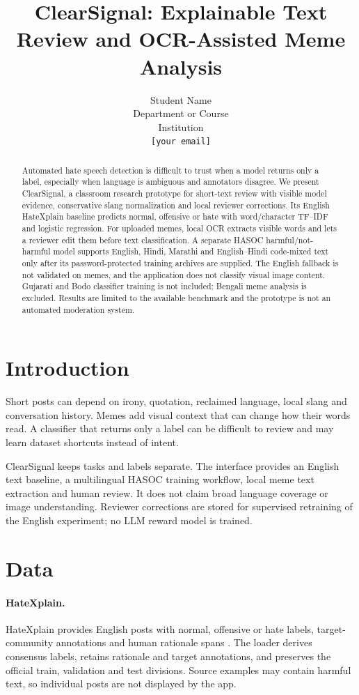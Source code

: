 \documentclass[11pt]{article}
\title{ClearSignal: Explainable Text Review and OCR-Assisted Meme Analysis}
\author{Student Name \\
  Department or Course \\
  Institution \\
  \texttt{[your email]}}
\begin{document}
\maketitle

\begin{abstract}
Automated hate speech detection is difficult to trust when a model returns only a label, especially when language is ambiguous and annotators disagree. We present ClearSignal, a classroom research prototype for short-text review with visible model evidence, conservative slang normalization and local reviewer corrections. Its English HateXplain baseline predicts normal, offensive or hate with word/character TF--IDF and logistic regression. For uploaded memes, local OCR extracts visible words and lets a reviewer edit them before text classification. A separate HASOC harmful/not-harmful model supports English, Hindi, Marathi and English--Hindi code-mixed text only after its password-protected training archives are supplied. The English fallback is not validated on memes, and the application does not classify visual image content. Gujarati and Bodo classifier training is not included; Bengali meme analysis is excluded. Results are limited to the available benchmark and the prototype is not an automated moderation system.
\end{abstract}

\section{Introduction}
Short posts can depend on irony, quotation, reclaimed language, local slang and conversation history. Memes add visual context that can change how their words read. A classifier that returns only a label can be difficult to review and may learn dataset shortcuts instead of intent.

ClearSignal keeps tasks and labels separate. The interface provides an English text baseline, a multilingual HASOC training workflow, local meme text extraction and human review. It does not claim broad language coverage or image understanding. Reviewer corrections are stored for supervised retraining of the English experiment; no LLM reward model is trained.

\section{Data}
\paragraph{HateXplain.} HateXplain provides English posts with normal, offensive or hate labels, target-community annotations and human rationale spans \citep{mathew-etal-2021-hatexplain}. The loader derives consensus labels, retains rationale and target annotations, and preserves the official train, validation and test divisions. Source examples may contain harmful text, so individual posts are not displayed by the app.
\end{document}
